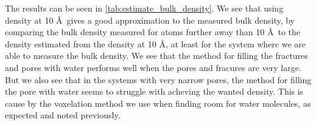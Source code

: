 The results can be seen in \cref{tab:estimate_bulk_density}. We see that using density at 10 \AA\ gives a good approximation to the measured bulk density, by comparing the bulk density measured for atoms further away than 10 \AA\ to the density estimated from the density at 10 \AA, at least for the system where we are able to measure the bulk density. We see that the method for filling the fractures and pores with water performs well when the pores and fracures are very large. But we also see that in the systems with very narrow pores, the method for filling the pore with water seems to struggle with acheving the wanted density. This is cause by the voxelation method we use when finding room for water molecules, as expected and noted previously.%
